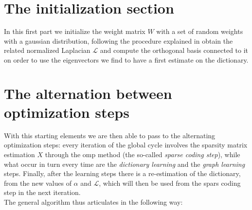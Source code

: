 \section{The initialization section}
In this first part we initialize the weight matrix $W$ with a set of random weights with a gaussian distribution, following the procedure explained in \cite{Kalofolias2016} obtain the related normalized Laplacian $\mathcal{L}$ and compute the orthogonal basis connected to it on order to use the eigenvectors we find to have a first estimate on the dictionary.

\section{The alternation between optimization steps}
With this starting elements we are then able to pass to the alternating optimization steps: every iteration of the global cycle involves the sparsity matrix estimation $X$ through the \gls{omp} method (the so-called \textit{sparse coding step}), while what occur in turn every time are the \textit{dictionary learning} and the \textit{graph learning} steps. Finally, after the learning steps there is a re-estimation of the dictionary, from the new values of $\alpha$ and $\mathcal{L}$, which will then be used from the spars coding step in the next iteration.\\
The general algorithm thus articulates in the following way:

